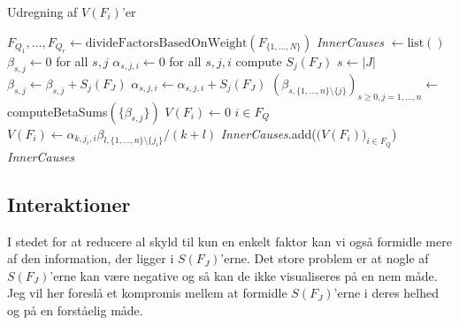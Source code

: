 \documentclass[a4paper, 12pt]{article}
\begin{document}
\begin{algorithm}
\caption{Udregning af $V(F_i)$'er}\label{inner_causes_Vs_multiplicity}
\begin{algorithmic}[1]
\State $F_{Q_1}, \dots, F_{Q_r} \gets \text{divideFactorsBasedOnWeight}(F_{\{1, \dots, N\}})$
\State \textit{InnerCauses} $ \gets \text{list}()$
 \State $\beta_{s,j} \gets 0$ for all $s,j$
 \State $\alpha_{s,j,i} \gets 0$ for all $s,j,i$
 \State compute $S_j(F_J)$
 \State $s\gets |J|$
 \State $\beta_{s,j} \gets \beta_{s,j}+S_j(F_J)$
 \State $\alpha_{s,j,i} \gets \alpha_{s,j,i} + S_j(F_J)$
 \EndFor
 \EndFor
 \EndFor
 \State $(\beta_{s,\{1, \dots, n\}\setminus \{j\}})_{s\geq 0, j=1, \dots, n} \gets $ computeBetaSums$(\{\beta_{s,j}\})$
 \State $V(F_i) \gets 0$  $i \in F_Q$
 \State $V(F_i)\gets \alpha_{k,j_i,i}\beta_{l,\{1, \dots,n\}\setminus \{j_i\}}/(k+l)$
 \EndFor
 \EndFor
 \EndFor
 \State \textit{InnerCauses}.add($\bigl(V(F_i)\bigr)_{i\in F_Q}$)
  \EndFor
  \State \Return \textit{InnerCauses}
\EndProcedure
\end{algorithmic}
\end{algorithm}

\subsection{Interaktioner}

I stedet for at reducere al skyld til kun en enkelt faktor kan vi også formidle mere af den information, der ligger i $S(F_J)$'erne. Det store problem er at nogle af $S(F_J)$'erne kan være negative og så kan de ikke visualiseres på en nem måde. Jeg vil her foreslå et kompromis mellem at formidle $S(F_J)$'erne i deres helhed og på en forståelig måde. 
\end{document}
